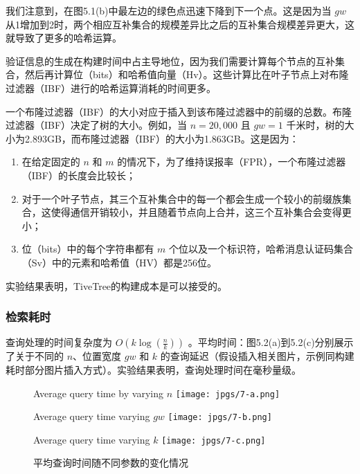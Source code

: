 \documentclass{cumcmthesis}
\numberwithin{equation}{section} %
\numberwithin{figure}{section} %
\numberwithin{table}{section} %
\begin{document}
我们注意到，在图5.1(b)中最左边的绿色点迅速下降到下一个点。这是因为当 \(gw\) 从1增加到2时，两个相应互补集合的规模差异比之后的互补集合规模差异更大，这就导致了更多的哈希运算。

验证信息的生成在构建时间中占主导地位，因为我们需要计算每个节点的互补集合，然后再计算位（bits）和哈希值向量（Hv）。这些计算比在叶子节点上对布隆过滤器（IBF）进行的哈希运算消耗的时间更多。

一个布隆过滤器（IBF）的大小对应于插入到该布隆过滤器中的前缀的总数。布隆过滤器（IBF）决定了树的大小。例如，当 \(n = 20,000\) 且 \(gw = 1\) 千米时，树的大小为2.893GB，而布隆过滤器（IBF）的大小为1.863GB。这是因为：
\begin{enumerate}
    \item 在给定固定的 \(n\) 和 \(m\) 的情况下，为了维持误报率（FPR），一个布隆过滤器（IBF）的长度会比较长；
    \item 对于一个叶子节点，其三个互补集合中的每一个都会生成一个较小的前缀族集合，这使得通信开销较小，并且随着节点向上合并，这三个互补集合会变得更小；
    \item 位（bits）中的每个字符串都有 \(m\) 个位以及一个标识符，哈希消息认证码集合（Sv）中的元素和哈希值（HV）都是256位。
\end{enumerate}
实验结果表明，TiveTree的构建成本是可以接受的。

\subsubsection{检索耗时}
查询处理的时间复杂度为 \(O(k\log(\frac{n}{k}))\) 。平均时间：图5.2(a)到5.2(c)分别展示了关于不同的 \(n\)、位置宽度 \(gw\) 和 \(k\) 的查询延迟（假设插入相关图片，示例同构建耗时部分图片插入方式）。实验结果表明，查询处理时间在毫秒量级。



\begin{figure}[h]
    \centering
    \begin{subcaptionbox}{Average query time by varying \(n\)}
        {\texttt{[image: jpgs/7-a.png]}}
    \end{subcaptionbox}
    \hspace{10pt}
    \begin{subcaptionbox}{Average query time varying \(gw\)}
        {\texttt{[image: jpgs/7-b.png]}}
    \end{subcaptionbox}
    \hspace{10pt}
    \begin{subcaptionbox}{Average query time varying \(k\)}
        {\texttt{[image: jpgs/7-c.png]}}
    \end{subcaptionbox}
    \caption{平均查询时间随不同参数的变化情况}
    \label{fig:query_time}
\end{figure}
\end{document}
